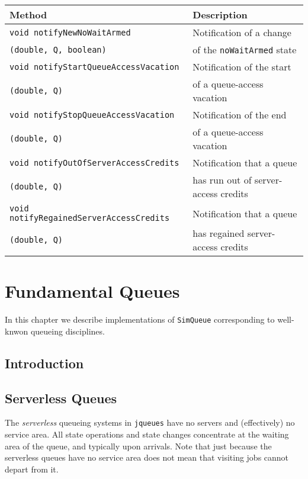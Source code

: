 \documentclass[12pt]{book}
\begin{document}
\begin{tabular}{|l|l|}
  \hline
  {\bf Method} & {\bf Description} \\
  \hline
  \lstinline[basicstyle=\footnotesize]!void notifyNewNoWaitArmed!
  & Notification of a change 
  \\
  \lstinline[basicstyle=\footnotesize]!(double, Q, boolean)!
  & of the \lstinline|noWaitArmed| state
  \\
  \hline
  \lstinline[basicstyle=\footnotesize]|void notifyStartQueueAccessVacation|
  & Notification of the start
  \\
  \lstinline[basicstyle=\footnotesize]|(double, Q)|
  & of a queue-access vacation
  \\
  \hline
  \lstinline[basicstyle=\footnotesize]|void notifyStopQueueAccessVacation|
  & Notification of the end
  \\
  \lstinline[basicstyle=\footnotesize]|(double, Q)|
  & of a queue-access vacation
  \\
  \hline
  \lstinline[basicstyle=\footnotesize]|void notifyOutOfServerAccessCredits|
  & Notification that a queue
  \\
  \lstinline[basicstyle=\footnotesize]|(double, Q)|
  & has run out of server-access credits
  \\
  \hline
  \lstinline[basicstyle=\footnotesize]|void notifyRegainedServerAccessCredits|
  & Notification that a queue
  \\
  \lstinline[basicstyle=\footnotesize]|(double, Q)|
  & has regained server-access credits
  \\
  \hline
\end{tabular}

\chapter{Fundamental Queues}

In this chapter we describe implementations of \lstinline|SimQueue| corresponding
  to well-knwon queueing disciplines.

\section{Introduction}

\section{Serverless Queues}

The {\em serverless\/} queueing systems in \lstinline|jqueues| 
  have no servers and (effectively) no service area.
All state operations and state changes concentrate
  at the waiting area of the queue,
  and typically upon arrivals.
Note that just because the serverless queues have no service area
  does not mean that visiting jobs cannot depart from it.
\end{document}
